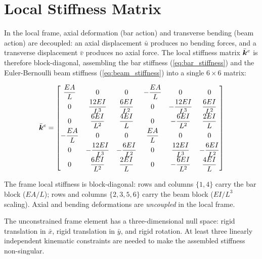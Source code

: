 \section{Local Stiffness Matrix}
\label{sec:frame_local_k}

In the local frame, axial deformation (bar action) and transverse bending
(beam action) are decoupled: an axial displacement $\bar{u}$ produces no
bending forces, and a transverse displacement $\bar{v}$ produces no axial
force. The local stiffness matrix $\bar{\bm{k}}^e$ is therefore
block-diagonal, assembling the bar stiffness (\cref{eq:bar_stiffness})
and the Euler-Bernoulli beam stiffness (\cref{eq:beam_stiffness}) into a
single $6\times6$ matrix:

\begin{equation}
    \bar{\matr{k}}^e =
    {\renewcommand{\arraystretch}{1.6}%
    \begin{bmatrix}
        \dfrac{EA}{L}   & 0 & 0 & -\dfrac{EA}{L} & 0 & 0 \\
        0 & \dfrac{12EI}{L^3} & \dfrac{6EI}{L^2} & 0 & -\dfrac{12EI}{L^3} & \dfrac{6EI}{L^2} \\
        0 & \dfrac{6EI}{L^2} & \dfrac{4EI}{L} & 0 & -\dfrac{6EI}{L^2} & \dfrac{2EI}{L} \\
        -\dfrac{EA}{L} & 0 & 0 & \dfrac{EA}{L} & 0 & 0 \\
        0 & -\dfrac{12EI}{L^3} & -\dfrac{6EI}{L^2} & 0 & \dfrac{12EI}{L^3} & -\dfrac{6EI}{L^2} \\
        0 & \dfrac{6EI}{L^2} & \dfrac{2EI}{L} & 0 & -\dfrac{6EI}{L^2} & \dfrac{4EI}{L}
    \end{bmatrix}}
    \label{eq:frame_local_k}
\end{equation}

\begin{importantbox}
The frame local stiffness is block-diagonal: rows and columns $\{1,4\}$
carry the bar block ($EA/L$); rows and columns $\{2,3,5,6\}$ carry the
beam block ($EI/L^3$ scaling). Axial and bending deformations are
\emph{uncoupled} in the local frame.
\end{importantbox}

\begin{remark}
The unconstrained frame element has a three-dimensional null space:
rigid translation in $\bar{x}$, rigid translation in $\bar{y}$, and rigid
rotation. At least three linearly independent kinematic constraints are
needed to make the assembled stiffness non-singular.
\end{remark}

